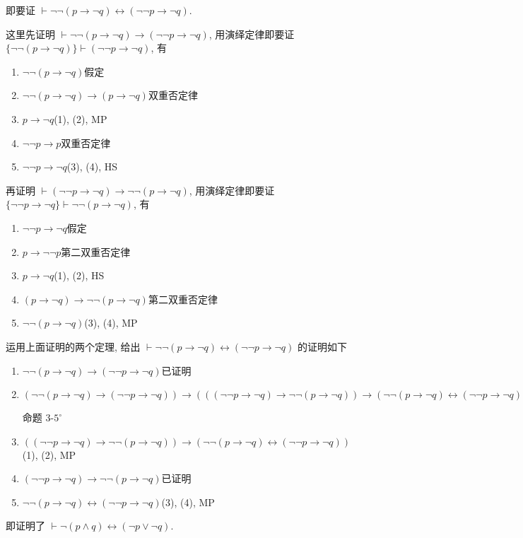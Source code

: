 \documentclass[boxes]{homework}
\begin{document}
\begin{solution}
    即要证 $\vdash \lnot\lnot (p\to \lnot q)\leftrightarrow(\lnot\lnot p\to\lnot q)$.

    这里先证明 $\vdash \lnot\lnot (p\to \lnot q)\to(\lnot\lnot p\to\lnot q)$, 用演绎定律即要证 $\{\lnot\lnot(p\to\lnot q)\}\vdash (\lnot\lnot p\to\lnot q)$, 有
    \begin{enumerate}[label = (\arabic*), itemsep = 0em, topsep = .5em, partopsep = .5em]
        \item $\lnot\lnot (p\to \lnot q)$\hfill 假定
        \item $\lnot\lnot (p\to \lnot q)\to (p\to\lnot q)$\hfill 双重否定律
        \item $p\to\lnot q$\hfill (1), (2), MP
        \item $\lnot\lnot p\to p$\hfill 双重否定律
        \item $\lnot\lnot p\to\lnot q$\hfill (3), (4), HS
    \end{enumerate}

    再证明 $\vdash (\lnot\lnot p\to \lnot q)\to\lnot\lnot (p\to\lnot q)$, 用演绎定律即要证 $\{\lnot\lnot p\to\lnot q\}\vdash \lnot\lnot (p\to\lnot q)$, 有
    \begin{enumerate}[label = (\arabic*), itemsep = 0em, topsep = .5em, partopsep = .5em]
        \item $\lnot\lnot p\to\lnot q$\hfill 假定
        \item $p\to\lnot\lnot p$\hfill 第二双重否定律
        \item $p\to\lnot q$\hfill (1), (2), HS
        \item $(p\to\lnot q)\to\lnot\lnot (p\to\lnot q)$\hfill 第二双重否定律
        \item $\lnot\lnot (p\to\lnot q)$\hfill (3), (4), MP
    \end{enumerate}

    运用上面证明的两个定理, 给出 $\vdash \lnot\lnot (p\to \lnot q)\leftrightarrow(\lnot\lnot p\to\lnot q)$ 的证明如下
    \begin{enumerate}[label = (\arabic*), itemsep = 0em, topsep = .5em, partopsep = .5em]
        \item $\lnot\lnot (p\to \lnot q)\to(\lnot\lnot p\to\lnot q)$\hfill 已证明
        \item $(\lnot\lnot (p\to \lnot q)\to(\lnot\lnot p\to\lnot q))\to (((\lnot\lnot p\to\lnot q)\to \lnot\lnot (p\to \lnot q))\to (\lnot\lnot (p\to \lnot q)\leftrightarrow(\lnot\lnot p\to\lnot q)))$

              \hfill 命题 3-$5^\circ$
        \item $((\lnot\lnot p\to\lnot q)\to \lnot\lnot (p\to \lnot q))\to (\lnot\lnot (p\to \lnot q)\leftrightarrow(\lnot\lnot p\to\lnot q))$\hfill (1), (2), MP
        \item $(\lnot\lnot p\to \lnot q)\to\lnot\lnot (p\to\lnot q)$\hfill 已证明
        \item $\lnot\lnot (p\to \lnot q)\leftrightarrow(\lnot\lnot p\to\lnot q)$\hfill (3), (4), MP
    \end{enumerate}
    即证明了 $\vdash \lnot (p\land q) \leftrightarrow (\lnot p\lor \lnot q)$.
\end{solution}
\end{document}
